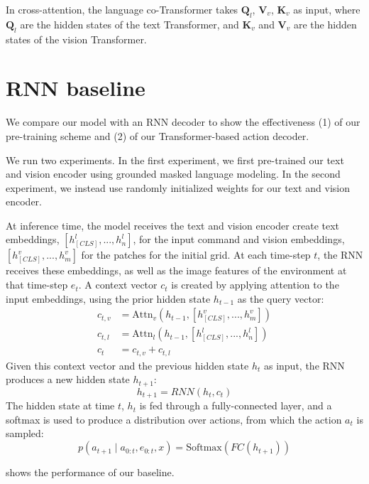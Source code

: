 \documentclass[11pt]{article}
\begin{document}
In cross-attention, the language co-Transformer takes $\mathbf{Q}_{l}$, $\mathbf{V}_{v}$, $\mathbf{K}_{v}$ as input, where $\mathbf{Q}_l$ are the hidden states of the text Transformer, and $\mathbf{K}_{v}$ and $\mathbf{V}_{v}$ are the hidden states of the vision Transformer.

\section{RNN baseline}
We compare our model with an RNN decoder to show the effectiveness (1) of our pre-training scheme and (2) of our Transformer-based action decoder.
%

We run two experiments.
%
In the first experiment, we first pre-trained our text and vision encoder using grounded masked language modeling. 
%
In the second experiment, we instead use randomly initialized weights for our text and vision encoder.

%
At inference time, the model receives the text and vision encoder create text embeddings, $[h_{[CLS]}^{l},...,h_{n}^{l}]$, for the input command and vision embeddings, $[h_{[CLS]}^{v},...,h_{m}^{v}]$ for the patches for the initial grid.
%
At each time-step $t$, the RNN receives these embeddings, as well as the image features of the environment at that time-step $e_t$.
%
A context vector $c_t$ is created by applying attention to the input embeddings, using the prior hidden state $h_{t-1}$ as the query vector:
\begin{align*}
c_{t,v} &= \text{Attn}_v(h_{t-1}, [h_{[CLS]}^{v},...,h_{m}^{v}])\\
c_{t,l} &= \text{Attn}_l(h_{t-1}, [h_{[CLS]}^{l},...,h_{n}^{l}])\\
c_t &= c_{t,v} + c_{t,l}
\end{align*}
Given this context vector and the previous hidden state $h_{t}$ as input, the RNN produces a new hidden state $h_{t+1}$:
$$
h_{t+1} = RNN(h_t, c_t)
$$
The hidden state at time $t$, $h_t$ is fed through a fully-connected layer, and a softmax is used to produce a distribution over actions, from which the action $a_t$ is sampled:
$$
p(a_{t+1} \mid a_{0:t}, e_{0:t}, x) = \text{Softmax}(FC(h_{t+1}))
$$
%

 shows the performance of our baseline.
\end{document}
